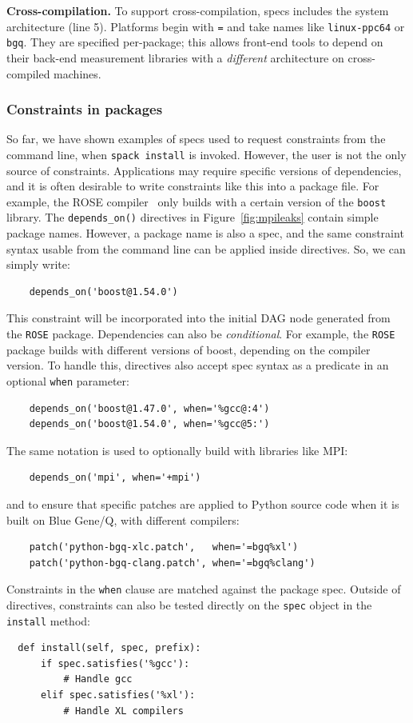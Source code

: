 {\bf Cross-compilation.}
To support cross-compilation, specs includes the system architecture (line 5).
Platforms begin with {\tt =} and take names like {\tt linux-ppc64} or {\tt bgq}.  They are
specified per-package; this allows front-end tools to depend on their back-end measurement
libraries with a {\it different} architecture on cross-compiled machines.

\subsubsection{Constraints in packages}\label{sec:constraints}

So far, we have shown examples of specs used to request constraints from the
command line, when {\tt spack install} is invoked.  However, the user is not the only
source of constraints.  Applications may require specific versions of dependencies,
and it is often desirable to write constraints like this into a package file.  For
example, the ROSE compiler~\cite{rose} only builds with a certain version of the {\tt boost} library.
The {\tt depends\_on()} directives in Figure~\ref{fig:mpileaks} contain
simple package names.  However, a package name is also a spec, and
the same constraint syntax usable from the command line can be applied inside directives.
So, we can simply write:
%
\begin{verbatim}
    depends_on('boost@1.54.0')
\end{verbatim}
%
This constraint will be incorporated into the initial DAG node generated from
the {\tt ROSE} package.  Dependencies can also be {\it conditional}.  For example,
the {\tt ROSE} package builds with different versions of boost, depending on the
compiler version. To handle this, directives also accept spec syntax as a
predicate in an optional {\tt when} parameter:
%
\begin{verbatim}
    depends_on('boost@1.47.0', when='%gcc@:4')
    depends_on('boost@1.54.0', when='%gcc@5:')
\end{verbatim}
%
\vfill\eject
\noindent
The same notation is used to optionally build with libraries like MPI:
%
\begin{verbatim}
    depends_on('mpi', when='+mpi')
\end{verbatim}
%
and to ensure that specific patches are applied to Python source code
when it is built on Blue Gene/Q, with different compilers:
%
\begin{verbatim}
    patch('python-bgq-xlc.patch',   when='=bgq%xl')
    patch('python-bgq-clang.patch', when='=bgq%clang')
\end{verbatim}
%
Constraints in the {\tt when} clause are matched against the package spec.
Outside of directives, constraints can also be tested directly on the {\tt spec}
object in the {\tt install} method:
%
\begin{verbatim}
  def install(self, spec, prefix):
      if spec.satisfies('%gcc'):
          # Handle gcc
      elif spec.satisfies('%xl'):
          # Handle XL compilers
\end{verbatim}
%

